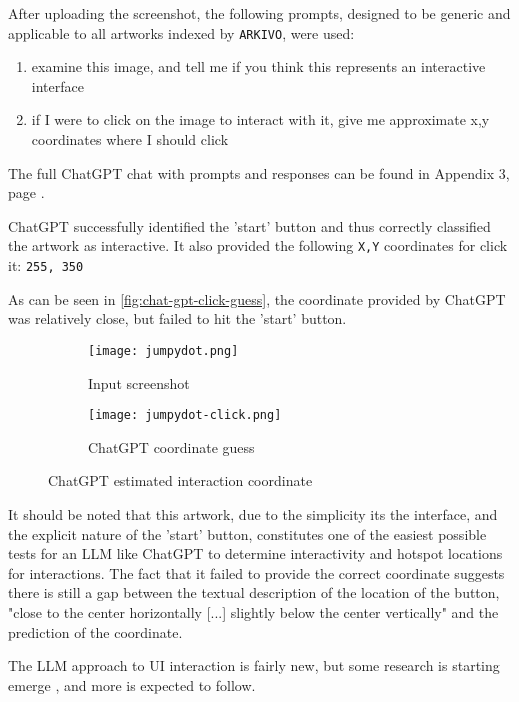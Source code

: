 After uploading the screenshot, the following prompts, designed to be generic and applicable to all artworks indexed by \texttt{ARKIVO}, were used:

\begin{enumerate}
	\item examine this image, and tell me if you think this represents an interactive interface
	\item if I were to click on the image to interact with it, give me approximate x,y coordinates where I should click
\end{enumerate}


The full ChatGPT chat with prompts and responses can be found in Appendix 3, page \pageref{chap:chatgpt-mouse}.

ChatGPT successfully identified the 'start' button and thus correctly classified the artwork as interactive. It also provided the following \texttt{X,Y} coordinates for click it: \texttt{255, 350}

As can be seen in \autoref{fig:chat-gpt-click-guess}, the coordinate provided by ChatGPT was relatively close, but failed to hit the 'start' button.

\begin{figure}[H]
  \centering
  \begin{subfigure}[b]{0.45\textwidth}
    \centering
    \texttt{[image: jumpydot.png]}
    \caption{Input screenshot}
    \label{fig:image1}
  \end{subfigure}
  \hfill
  \begin{subfigure}[b]{0.45\textwidth}
    \centering
    \texttt{[image: jumpydot-click.png]}
    \caption{ChatGPT coordinate guess}
    \label{fig:image2}
  \end{subfigure}
  \caption{ChatGPT estimated interaction coordinate}
  \label{fig:chat-gpt-click-guess}
\end{figure}

It should be noted that this artwork, due to the simplicity its the interface, and the explicit nature of the 'start' button, constitutes one of the easiest possible tests for an LLM like ChatGPT to determine interactivity and hotspot locations for interactions. The fact that it failed to provide the correct coordinate suggests there is still a gap between the textual description of the location of the button, "close to the center horizontally [...] slightly below the center vertically" and the prediction of the coordinate.

The LLM approach to UI interaction is fairly new, but some research is starting emerge \cite{liuMakeLLMTesting2024}, and more is expected to follow.

